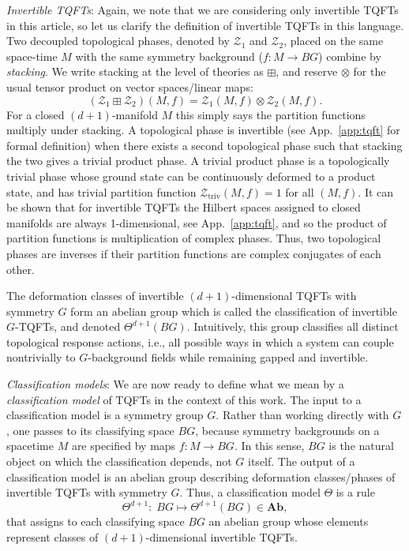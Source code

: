 \documentclass[aps,prx,reprint,superscriptaddress,twocolumn,amsmath,amssymb,amsfonts, nofootinbib]{revtex4-2}
\newcommand{\catname}[1]{{\textbf{#1}}}
\newcommand{\Ab}{\catname{Ab}}
\theoremstyle{apsstyle}
\begin{document}
\bigskip 

\noindent \textit{Invertible TQFTs}: Again, we note that we are considering only invertible TQFTs in this article, so let us clarify the definition of invertible TQFTs in this language. Two decoupled topological phases, denoted by $\mathcal Z_{1}$ and $\mathcal Z_{2}$, placed on the same space-time $M$ with the same symmetry background ($f: M\to BG$) combine by \emph{stacking}. We write stacking at the level of theories as $\boxplus$, and reserve $\otimes$ for the usual tensor product on vector spaces/linear maps:
\begin{equation*}
(\mathcal{Z}_{1}\boxplus \mathcal{Z}_{2})(M,f)= \mathcal{Z}_{1}(M,f)\otimes \mathcal{Z}_{2}(M,f).
\end{equation*}
For a closed $(d{+}1)$-manifold $M$ this simply says the partition functions multiply under stacking. A topological phase is invertible (see App.~\ref{app:tqft} for formal definition)
when there exists a second topological phase such that stacking the two gives a trivial
product phase. A trivial product phase is a topologically trivial phase whose ground state can be continuously deformed to a product state, and has trivial partition function $\mathcal{Z}_{\mathrm{triv}}(M, f)=1$ for all $(M,f)$. It can be shown that for invertible TQFTs the Hilbert spaces assigned to closed manifolds  are always 1-dimensional, see App.~\ref{app:tqft}, and so the product of partition functions is multiplication of complex phases. Thus, two topological phases are inverses if their partition functions are complex conjugates of each other.  

The deformation classes of invertible $(d{+}1)$-dimensional TQFTs with symmetry $G$ form an abelian group which is called the classification of invertible $G$-TQFTs, and denoted $\Theta^{d+1}(BG)$. Intuitively, this group classifies all distinct topological response actions, i.e., all possible ways in which a system can couple nontrivially to $G$-background fields while remaining gapped and invertible.

\bigskip 

\noindent \textit{Classification models}: We are now ready to define what we mean by a \textit{classification model} of TQFTs in the context of this work.  
The input to a classification model is a symmetry group $G$. Rather than working directly with $G$, one passes to its classifying space $BG$, because symmetry backgrounds on a spacetime $M$ are specified by maps $f:M\to BG$.  
In this sense, $BG$ is the natural object on which the classification depends, not $G$ itself.  The output of a classification model is an abelian group describing deformation classes/phases of invertible TQFTs with symmetry $G$. Thus, a classification model $\Theta$ is a rule
\begin{equation*}
\Theta^{d+1}:\; BG \longmapsto \Theta^{d+1}(BG)\in \Ab,
\end{equation*}
that assigns to each classifying space $BG$ an abelian group whose elements represent classes of $(d{+}1)$-dimensional invertible TQFTs.  
\end{document}
